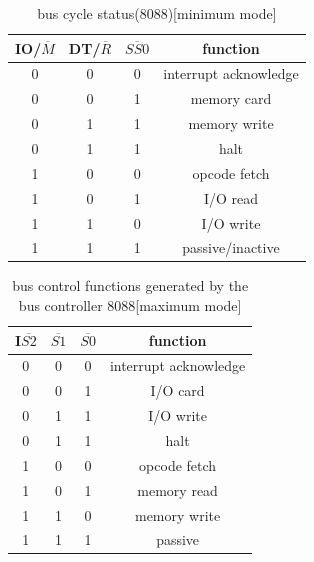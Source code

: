\documentclass[12pt]{article}
\begin{document}
\begin{itemize}
\begin{itemize}
	\end{itemize}  

	\begin{table}[H]
		\centering
		\begin{tabular}{|c|c|c|c|}
			\hline
			IO/$\overline{M}$ & DT/$\overline{R}$ & $\overline{SS0}$ & \textbf{function}\\\hline
			
			0 & 0 & 0 & interrupt acknowledge\\\hline
			0 & 0 & 1 & memory card\\\hline
			0 & 1 & 1 & memory write\\\hline
			0 & 1 & 1 & halt\\\hline
			1 & 0 & 0 & opcode fetch\\\hline
			1 & 0 & 1 & I/O read\\\hline
			1 & 1 & 0 & I/O write\\\hline
			1 & 1 & 1 & passive/inactive\\\hline
		\end{tabular}
		\caption{bus cycle status(8088)[minimum mode]}
	\end{table}

		\begin{table}[H]
		\centering
		\begin{tabular}{|c|c|c|c|}
			\hline
			I$\overline{S2}$ & $\overline{S1}$ & $\overline{S0}$ & \textbf{function}\\\hline
			
			0 & 0 & 0 & interrupt acknowledge\\\hline
			0 & 0 & 1 & I/O card\\\hline
			0 & 1 & 1 & I/O write\\\hline
			0 & 1 & 1 & halt\\\hline
			1 & 0 & 0 & opcode fetch\\\hline
			1 & 0 & 1 & memory read\\\hline
			1 & 1 & 0 & memory write\\\hline
			1 & 1 & 1 & passive\\\hline
		\end{tabular}
		\caption{bus control functions generated by the bus controller 8088[maximum mode]}
	\end{table}
\end{itemize}

\newpage

\end{document}
